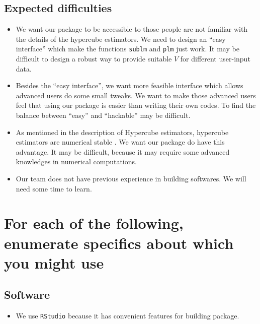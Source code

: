 \documentclass[draft]{article}
\begin{document}
\subsection{Expected difficulties}
\begin{itemize}

	\item We want our package to be accessible to those people are not familiar with the details of the hypercube estimators. We need to design an ``easy interface'' which make the functions {\tt sublm} and {\tt plm} just work. It may be difficult to design a robust way to provide suitable $V$ for different user-input data.

	\item Besides the ``easy interface'', we want more feasible interface which allows advanced users do some small tweaks. We want to make those advanced users feel that using our package is easier than writing their own codes. To find the balance between ``easy'' and ``hackable'' may be difficult.

	\item As mentioned in the description of Hypercube estimators, hypercube estimators are numerical stable \cite{beran2014hypercube}. We want our package do have this advantage. It may be difficult, because it may require some advanced knowledges in numerical computations.

	\item Our team does not have previous experience in building softwares. We will need some time to learn.

\end{itemize}


\section{For each of the following, enumerate specifics about which you might use}


\subsection{Software}
\begin{itemize}
	\item We use \texttt{RStudio} because it has convenient features for building package.
\end{itemize}






 
\end{document}

